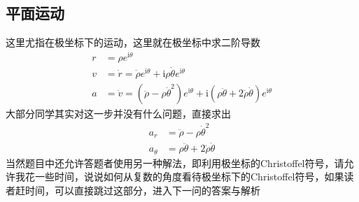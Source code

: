 \documentclass[UTF8]{ctexart}
\begin{document}
\subsection{平面运动}
这里尤指在极坐标下的运动，这里就在极坐标中求二阶导数
\begin{align}
    r &= \rho e^{\mathrm{i}\theta}\\
    v &= \dot{r} = \dot{\rho}e^{\mathrm{i}\theta}+\mathrm{i}\rho \dot{\theta} e^{\mathrm{i}\theta}\label{eq:v}\\
    a &= \dot{v} = (\ddot{\rho}-\rho \dot{\theta}^2)e^{\mathrm{i}\theta}+\mathrm{i}(\rho \ddot{\theta}+2\dot{\rho} \dot{\theta})e^{\mathrm{i}\theta}\label{eq:ac}
\end{align}
大部分同学其实对这一步并没有什么问题，直接求出
\begin{align*}
    a_r &=\ddot{\rho}-\rho \dot{\theta}^2\\
    a_\theta &= \rho \ddot{\theta}+2\dot{\rho} \dot{\theta}
\end{align*}
当然题目中还允许答题者使用另一种解法，即利用极坐标的Christoffel符号，请允许我花一些时间，说说如何从复数的角度看待极坐标下的Christoffel符号，如果读者赶时间，可以直接跳过这部分，进入下一问的答案与解析
\end{document}
